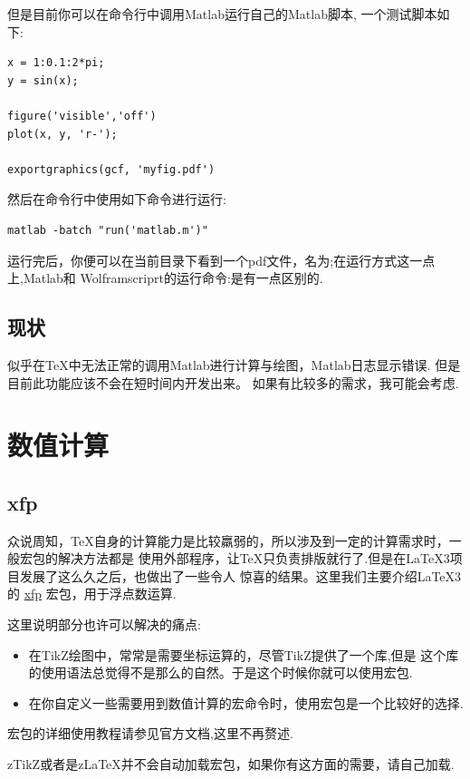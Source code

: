 但是目前你可以在命令行中调用Matlab运行自己的Matlab脚本, 一个测试脚本如下:
\begin{verbatim}
x = 1:0.1:2*pi;
y = sin(x);

figure('visible','off')
plot(x, y, 'r-');

exportgraphics(gcf, 'myfig.pdf') 
\end{verbatim}

然后在命令行中使用如下命令进行运行:
\begin{verbatim}
matlab -batch "run('matlab.m')"
\end{verbatim}

运行完后，你便可以在当前目录下看到一个pdf文件，名为;在运行方式这一点上,Matlab和
Wolframscriprt的运行命令:是有一点区别的.

\subsection{现状}
似乎在\TeX{}中无法正常的调用Matlab进行计算与绘图，Matlab日志显示错误. 但是目前此功能应该不会在短时间内开发出来。
如果有比较多的需求，我可能会考虑.

\section{数值计算}
\subsection{xfp}
众说周知，\TeX{}自身的计算能力是比较羸弱的，所以涉及到一定的计算需求时，一般宏包的解决方法都是
使用外部程序，让\TeX{}只负责排版就行了.但是在\LaTeX3项目发展了这么久之后，也做出了一些令人 
惊喜的结果。这里我们主要介绍\LaTeX3的 \href{https://www.ctan.org/pkg/xfp}{xfp} 宏包，用于浮点数运算. 

这里说明部分也许可以解决的痛点: 
\begin{itemize}
    \item 在TikZ绘图中，常常是需要坐标运算的，尽管TikZ提供了一个库,但是
        这个库的使用语法总觉得不是那么的自然。于是这个时候你就可以使用宏包.
    \item 在你自定义一些需要用到数值计算的宏命令时，使用宏包是一个比较好的选择.
\end{itemize}

宏包的详细使用教程请参见官方文档,这里不再赘述.

\begin{leftbar}
\noindent zTikZ或者是z\LaTeX{}并不会自动加载宏包，如果你有这方面的需要，请自己加载.
\end{leftbar}


